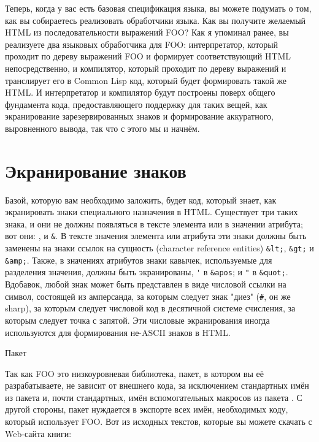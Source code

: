 Теперь, когда у вас есть базовая спецификация языка, вы можете подумать о том, как вы
собираетесь реализовать обработчики языка. Как вы получите желаемый HTML из
последовательности выражений FOO? Как я упоминал ранее, вы реализуете два языковых
обработчика для FOO: интерпретатор, который проходит по дереву выражений FOO и формирует
соответствующий HTML непосредственно, и компилятор, который проходит по дереву выражений и
транслирует его в Common Lisp код, который будет формировать такой же HTML. И
интерпретатор и компилятор будут построены поверх общего фундамента кода, предоставляющего
поддержку для таких вещей, как экранирование зарезервированных знаков и формирование
аккуратного, выровненного вывода, так что с этого мы и начнём.

\section{Экранирование знаков}

Базой, которую вам необходимо заложить, будет код, который знает, как экранировать знаки
специального назначения в HTML. Существует три таких знака, и они не должны появляться в
тексте элемента или в значении атрибута; вот они: \code{<}, \code{>} и \lstinline!&!. В
тексте значения элемента или атрибута эти знаки должны быть заменены на знаки ссылок на
сущность (character reference entities) \lstinline!&lt;!, \lstinline!&gt;! и
\lstinline!&amp;!. Также, в значениях атрибутов знаки кавычек, используемые для разделения
значения, должны быть экранированы, \lstinline!'! в \lstinline!&apos!; и \lstinline!"! в
\lstinline!&quot;!. Вдобавок, любой знак может быть представлен в виде числовой ссылки на
символ, состоящей из амперсанда, за которым следует знак "диез" (\lstinline!#!, он же
sharp), за которым следует числовой код в десятичной системе счисления, за которым следует
точка с запятой. Эти числовые экранирования иногда используются для формирования не-ASCII
знаков в HTML.


Пакет 

Так как FOO это низкоуровневая библиотека, пакет, в котором вы её разрабатываете, не
зависит от внешнего кода, за исключением стандартных имён из пакета  и,
почти стандартных, имён вспомогательных макросов из пакета
. С другой стороны, пакет нуждается в экспорте всех
имён, необходимых коду, который использует FOO. Вот  из исходных текстов,
которые вы можете скачать с Web-сайта книги:

